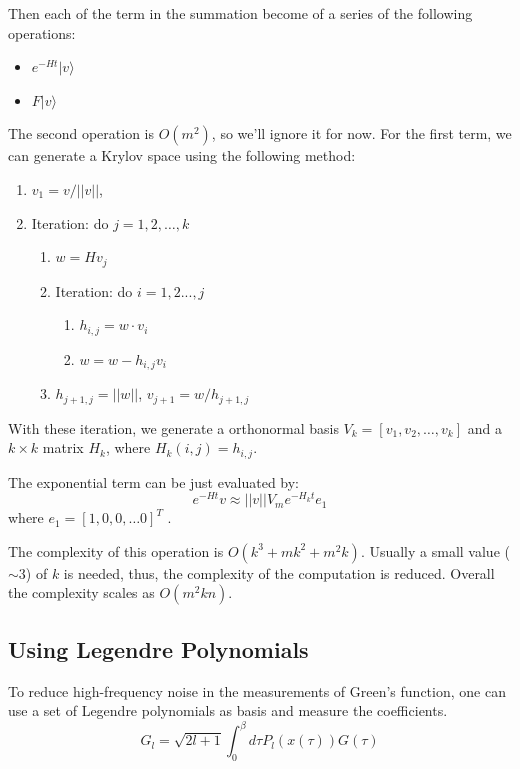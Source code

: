 Then each of the term in the summation become of a series of the following 
operations:
\begin{itemize}
\item $e^{-Ht}|v\rangle$
\item $F|v\rangle$
\end{itemize}

The second operation is $O(m^2)$, so we'll ignore it for now. For the first term,
we can generate a Krylov space using the following method: 
\begin{enumerate}
\item $v_1=v/||v||$,
\item Iteration: do $j=1,2,\ldots,k$ 
  \begin{enumerate}
  \item $w=Hv_j$
  \item Iteration: do $i=1,2...,j$
    \begin{enumerate}
    \item $h_{i,j}=w\cdot v_i$
    \item $w=w-h_{i,j}v_i$
    \end{enumerate}
  \item  $h_{j+1,j}=||w||$, $v_{j+1}=w/h_{j+1,j}$
  \end{enumerate}

\end{enumerate}

With these iteration, we generate a orthonormal basis 
$V_k=[v_1,v_2,\ldots, v_k]$
and a $k\times k$ matrix $H_k$, where $H_k(i,j)=h_{i,j}$.

The exponential term can be just evaluated by:
\[
e^{-Ht}v \approx ||v|| V_m e^{-H_k t}e_1
\]
where $e_1 = [1, 0, 0, \ldots 0]^T$ . 

The complexity of this operation is $O(k^3+mk^2+m^2k)$. Usually a small value ($\sim 3$)
of $k$ is needed, thus, the complexity of the computation is reduced. 
Overall the complexity scales as $O(m^2kn)$.


\subsection{Using Legendre Polynomials}

To reduce high-frequency noise in the measurements of Green's function, 
one can use a set of Legendre polynomials\citep{2011PhRvB..84g5145B} as basis and measure the coefficients. 
\[
G_l=\sqrt{2l+1}\int_0^\beta d\tau P_l(x(\tau))G(\tau)
\]

